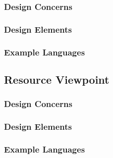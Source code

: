 \documentclass[onecolumn, draftclsnofoot,10pt, compsoc]{IEEEtran}
\begin{document}
\subsubsection{Design Concerns}

\subsubsection{Design Elements}

\subsubsection{Example Languages}

\subsection{Resource Viewpoint}
\subsubsection{Design Concerns}

\subsubsection{Design Elements}

\subsubsection{Example Languages}
\end{document}
